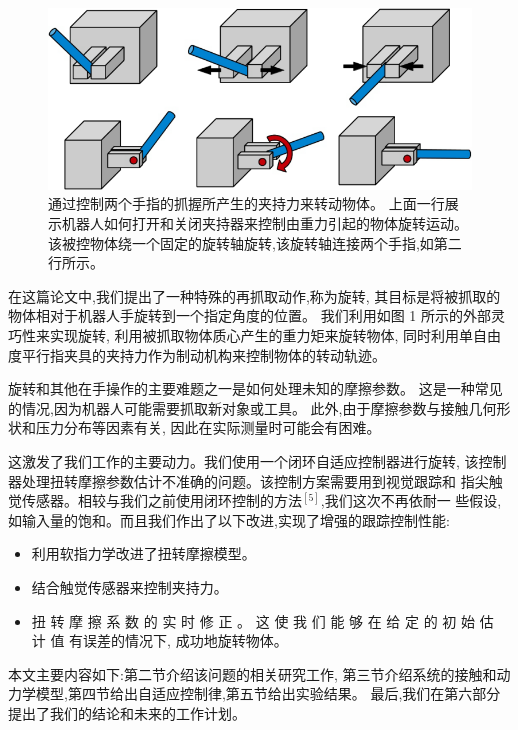 \begin{figure}[!ht]
  \centering
  \includegraphics[scale=0.5]{appendices/pic/1-1}
  \caption*{
    通过控制两个手指的抓握所产生的夹持力来转动物体。
    上面一行展示机器人如何打开和关闭夹持器来控制由重力引起的物体旋转运动。
    该被控物体绕一个固定的旋转轴旋转,该旋转轴连接两个手指,如第二行所示。}
  \vspace{-0.3cm}
\end{figure}


在这篇论文中,我们提出了一种特殊的再抓取动作,称为旋转,
其目标是将被抓取的物体相对于机器人手旋转到一个指定角度的位置。
我们利用如图 1 所示的外部灵巧性来实现旋转,
利用被抓取物体质心产生的重力矩来旋转物体,
同时利用单自由度平行指夹具的夹持力作为制动机构来控制物体的转动轨迹。

旋转和其他在手操作的主要难题之一是如何处理未知的摩擦参数。
这是一种常见的情况,因为机器人可能需要抓取新对象或工具。
此外,由于摩擦参数与接触几何形状和压力分布等因素有关,
因此在实际测量时可能会有困难。

这激发了我们工作的主要动力。我们使用一个闭环自适应控制器进行旋转,
该控制器处理扭转摩擦参数估计不准确的问题。该控制方案需要用到视觉跟踪和
指尖触觉传感器。相较与我们之前使用闭环控制的方法$^{[5]}$,我们这次不再依耐一
些假设,如输入量的饱和。而且我们作出了以下改进,实现了增强的跟踪控制性能:

\begin{itemize}
  \item 利用软指力学改进了扭转摩擦模型。
  \item 结合触觉传感器来控制夹持力。
  \item 扭 转 摩 擦 系 数 的 实 时 修 正 。
				这 使 我 们 能 够 在 给 定 的 初 始 估 计 值 有误差的情况下,
				成功地旋转物体。
\end{itemize}


本文主要内容如下:第二节介绍该问题的相关研究工作,
第三节介绍系统的接触和动力学模型,第四节给出自适应控制律,第五节给出实验结果。
最后,我们在第六部分提出了我们的结论和未来的工作计划。

